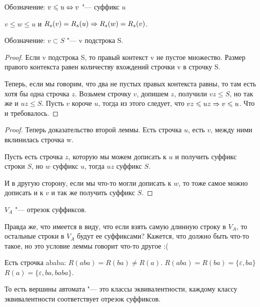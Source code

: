 \begin{description}
    \begin{Def}
    Обозначение: $v \leqslant u \Leftrightarrow v$ "--- суффикс $u$
    \end{Def}

    \begin{lemma}
    $v \le w \le u$ и $R_s(v) = R_s(u) \Rightarrow R_s(w) = R_s(v)$.
    \end{lemma}
    
    \begin{Def}
    Обозначение: $v \subset S$ "--- v подстрока S. 
    \end{Def}

    \begin{proof}
    Если v подстрока S, то правый контекст v не пустое множество. Размер правого контекста равен количеству 
    вхождений строчки v в строчку S. 

    Теперь, если мы говорим, что два не пустых правых контекста равны, то там есть хотя бы одна строчка $z$.
    Возьмем строчку $v$, допишем $z$, получили $vz \le S$, но так же и $uz \le S$. Пусть $v$ короче $u$, тогда
    из этого следует, что $vz \leqslant uz \Rightarrow v \leqslant u$. Что и требовалось.
    \end{proof}
    \begin{proof}
    Теперь доказательство второй леммы. Есть строчка $u$, есть $v$, между ними вклинилась строчка w. 

    Пусть есть строчка $z$, которую мы можем дописать к $u$ и получить суффикс строки $S$, но $w$ суффикс $u$, тогда $uz$  суффикс $S$.

    И в другую сторону, если мы что-то могли дописать к $w$, то тоже самое можно дописать и к $v$ и так же получить суффикс $S$.
    \end{proof}
    
    \begin{lemma}
    $V_A$ "--- отрезок суффиксов.
    \end{lemma}
    \TODO Правда же, что имеется в виду, что если взять самую длинную строку в $V_A$, то остальные строки в $V_A$ будут ее суффиксами?
    Кажется, что должно быть что-то такое, но это условие леммы говорит что-то другое :( \TODO
    \begin{exmp}
    Есть строчка ababa:
    $R(aba) = R(ba) \ne R(a)$.
    $R(aba) = R(ba) = \{\varepsilon, ba\}$
    $R(a) = \{\varepsilon, ba, baba\}$.
    \end{exmp}

    То есть вершины автомата "--- это классы эквивалентности, каждому классу 
    эквивалентности соответствует отрезок суффиксов. 
    

\end{description}

